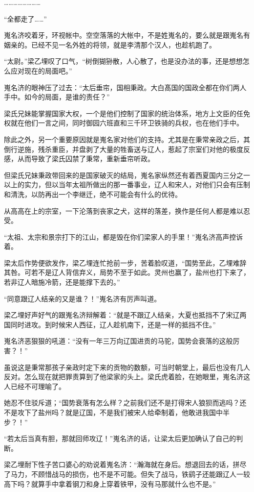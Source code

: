 ……………………

“全都走了……”

嵬名济咬着牙，环视帐中。空空落落的大帐中，不是姓嵬名的，要么就是跟嵬名有姻亲的。已经不见一名外姓的将领，就是李清那个汉人，也趁机跑了。

“太尉。”梁乙埋叹了口气，“树倒猢狲散，人心散了，也是没办法的事，还是想想怎么应对现在的局面吧。”

嵬名济的眼神压了过去：“太后垂帘，国相秉政。大白髙国的国政全都在你们两人手中。如今的局面，是谁的责任？”

梁氏兄妹能掌握国家大权，一个是他们控制了国家的统治体系，地方上文臣的任免权就在他们一言之间，同时御园六班直和三千环卫铁骑的兵权，也在他们手中。

除此之外，另一个重要原因就是嵬名家对他们的支持。尤其是在秉常亲政之后，其倒行逆施，残杀重臣，并盘剥了大量的牲畜送与辽人，惹起了宗室们对他的极度反感，从而导致了梁氏囚禁了秉常，重新垂帘听政。

但梁氏兄妹秉政带回来的是国家破灭的结局，嵬名家纵然还有着西夏国内三分之一以上的实力，但以当年太祖所做出的那一番事业，辽人和宋人，对他们只会有压制和清洗，以防再出一个李继迁，绝不可能会有什么的优待。

从高高在上的宗室，一下沦落到丧家之犬，这样的落差，换作是任何人都是难以忍受。

“太祖、太宗和景宗打下的江山，都是毁在你们梁家人的手里！”嵬名济高声控诉着。

梁太后作势便欲发作，梁乙埋连忙抢前一步，苦着脸叹道，“国势至此，乙埋难辞其咎。可若不是辽人背信弃义，局势不至于如此。灵州也赢了，盐州也打下来了，若非辽人暗施冷箭，还是能撑下去的。”

“同意跟辽人结亲的又是谁？！”嵬名济有厉声叫道。

梁乙埋好声好气的跟嵬名济辩解着：“就是不跟辽人结亲，大夏也抵挡不了宋辽两国同时进攻。到时候宋人西征，辽人趁机南下，还是一样的抵挡不住。”

嵬名济恶狠狠的吼道：“没有一年三万向辽国进贡的马驼，国势会衰落的这般厉害？！”

虽说这是秉常那孩子亲政时定下来的贡物的数额，可当时朝堂上，最后也没有几人反对。怎么现在就把罪责算到了他梁家的头上。梁氏虎着脸，在她眼里，嵬名济这人已经不可理喻了。

她忍不住驳斥道；“国势衰落有怎么样？之前我们还不是打得宋人狼狈而逃吗？还不是攻下了盐州吗？就是辽国，不是我们被宋人给牵制着，他敢进我国中半步？！”

“若太后当真有胆，那就回师攻辽！”嵬名济的话，让梁太后更加确认了自己的判断。

梁乙埋耐下性子苦口婆心的劝说着嵬名济：“瀚海就在身后。想退回去的话，拼尽了马力，不顾惜战马的损伤，也不是不可能。但失了战马，铁鹞子还能跟辽人一较高下吗？就算手中拿着钢刀和身上穿着铁甲，没有马那就什么也不是。”

